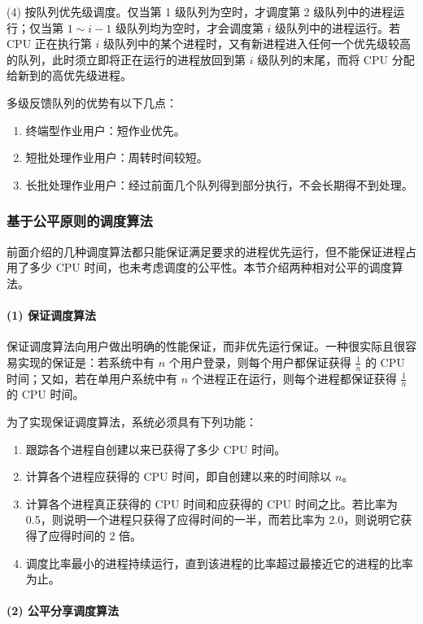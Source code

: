 \documentclass{ctexbook}
\begin{document}
	(4) 按队列优先级调度。仅当第 1 级队列为空时，才调度第 2 级队列中的进程运行；仅当第 $1 \sim i-1$ 级队列均为空时，才会调度第 $i$ 级队列中的进程运行。若 CPU 正在执行第 $i$ 级队列中的某个进程时，又有新进程进入任何一个优先级较高的队列，此时须立即将正在运行的进程放回到第 $i$ 级队列的末尾，而将 CPU 分配给新到的高优先级进程。
	
	多级反馈队列的优势有以下几点：
	\begin{enumerate}
		\item 终端型作业用户：短作业优先。
		\item 短批处理作业用户：周转时间较短。
		\item 长批处理作业用户：经过前面几个队列得到部分执行，不会长期得不到处理。
	\end{enumerate}
	
	\subsubsection{基于公平原则的调度算法}
	
	前面介绍的几种调度算法都只能保证满足要求的进程优先运行，但不能保证进程占用了多少 CPU 时间，也未考虑调度的公平性。本节介绍两种相对公平的调度算法。
	
	\paragraph{(1) 保证调度算法}
	
	保证调度算法向用户做出明确的性能保证，而非优先运行保证。一种很实际且很容易实现的保证是：若系统中有 $n$ 个用户登录，则每个用户都保证获得 $\frac{1}{n}$ 的 CPU 时间；又如，若在单用户系统中有 $n$ 个进程正在运行，则每个进程都保证获得 $\frac{1}{n}$ 的 CPU 时间。
	
	为了实现保证调度算法，系统必须具有下列功能：
	\begin{enumerate}
		\item 跟踪各个进程自创建以来已获得了多少 CPU 时间。
		\item 计算各个进程应获得的 CPU 时间，即自创建以来的时间除以 $n$。
		\item 计算各个进程真正获得的 CPU 时间和应获得的 CPU 时间之比。若比率为 0.5，则说明一个进程只获得了应得时间的一半，而若比率为 2.0，则说明它获得了应得时间的 2 倍。
		\item 调度比率最小的进程持续运行，直到该进程的比率超过最接近它的进程的比率为止。
	\end{enumerate}
	
	\paragraph{(2) 公平分享调度算法}
	
\end{document}
